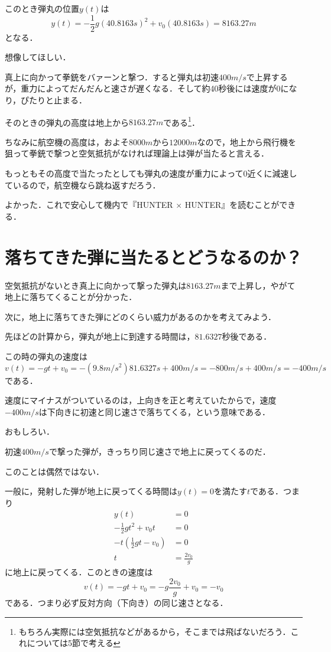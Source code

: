 \documentclass[a4paper,12pt]{jarticle}
\theoremstyle{definition}%
\begin{document}
このとき弾丸の位置$y(t)$は
\[ 
y(t)=-\frac{1}{2}g(40.8163s)^2+v_0(40.8163s)=8163.27m
\]
となる．

想像してほしい．

真上に向かって拳銃をバァーンと撃つ．すると弾丸は初速$400m/s$で上昇するが，重力によってだんだんと速さが遅くなる．そして約40秒後には速度が0になり，ぴたりと止まる．

そのときの弾丸の高度は地上から$8163.27m$である\footnote{もちろん実際には空気抵抗などがあるから，そこまでは飛ばないだろう．これについては5節で考える}．

ちなみに航空機の高度は，およそ$8000m$から$12000m$なので，地上から飛行機を狙って拳銃で撃つと空気抵抗がなければ理論上は弾が当たると言える．

もっともその高度で当たったとしても弾丸の速度が重力によって0近くに減速しているので，航空機なら跳ね返すだろう．

よかった．これで安心して機内で『HUNTER $\times$ HUNTER』を読むことができる．



\section{落ちてきた弾に当たるとどうなるのか？}


空気抵抗がないとき真上に向かって撃った弾丸は$8163.27m$まで上昇し，やがて地上に落ちてくることが分かった．

次に，地上に落ちてきた弾にどのくらい威力があるのかを考えてみよう．

先ほどの計算から，弾丸が地上に到達する時間は，$81.6327$秒後である．

この時の弾丸の速度は
\[ 
v(t)=-gt+v_0=-(9.8m/s^2)81.6327s+400m/s=-800m/s+400m/s=-400m/s
\]
である．

速度にマイナスがついているのは，上向きを正と考えていたからで，速度$-400m/s$は下向きに初速と同じ速さで落ちてくる，という意味である．

おもしろい．


初速$400m/s$で撃った弾が，きっちり同じ速さで地上に戻ってくるのだ．

このことは偶然ではない．


一般に，発射した弾が地上に戻ってくる時間は$y(t)=0$を満たす$t$である．つまり
\begin{align*}
y(t)&=0  \\ 
-\frac{1}{2}gt^2+v_0 t&=0\\
-t(\frac{1}{2}gt-v_0)&=0\\
t&=\frac{2v_0}{g}   
\end{align*} 
に地上に戻ってくる．このときの速度は
\[ 
v(t)=-gt+v_0=-g\frac{2v_0}{g}+v_0=-v_0
 \]
である．つまり必ず反対方向（下向き）の同じ速さとなる．
\end{document}

